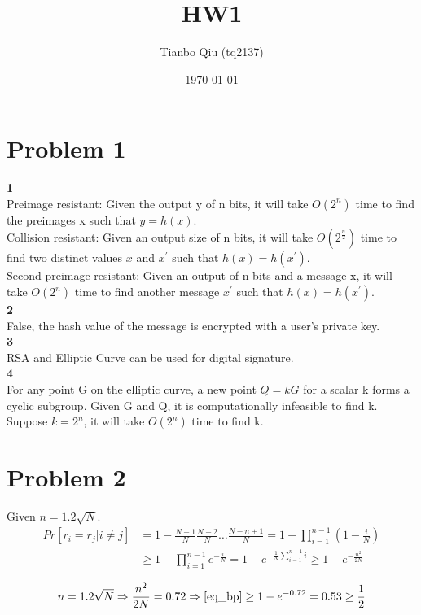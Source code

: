 \documentclass[latterpaper]{article}
\begin{document}
\title{HW1}
\author{Tianbo Qiu (tq2137)}
\date{\today}
\maketitle

\section*{Problem 1}
{\bf\normalsize 1} \\
Preimage resistant: Given the output y of n bits, it will take $O(2^n)$ time to find the preimages x such that $y=h(x)$.\\
Collision resistant: Given an output size of n bits, it will take $O(2^{\frac{n}{2}})$ time to find two distinct values $x$ and $x^{\prime}$ such that $h(x)=h(x^{\prime})$. \\
Second preimage resistant: Given an output of n bits and a message x, it will take $O(2^n)$ time to find another message $x^{\prime}$ such that $h(x)=h(x^{\prime})$.\\
{\bf 2} \\
False, the hash value of the message is encrypted with a user's private key.\\
{\bf 3} \\
RSA and Elliptic Curve can be used for digital signature. \\
{\bf 4} \\
For any point G on the elliptic curve, a new point $Q=kG$ for a scalar k forms a cyclic subgroup. Given G and Q, it is computationally infeasible to find k. Suppose $k=2^n$, it will take $O(2^n)$ time to find k.

\section*{Problem 2}
Given $n=1.2\sqrt{N}$.
\begin{equation}
\label{eq_bp}
\begin{split}
Pr[r_i=r_j | i \neq j] & =1-\frac{N-1}{N}\frac{N-2}{N}\dots\frac{N-n+1}{N}=1-\prod_{i=1}^{n-1} (1-\frac{i}{N}) \\
& \geq 1-\prod_{i=1}^{n-1}e^{-\frac{i}{N}}=1-e^{-\frac{1}{N}\sum_{i=1}^{n-1}i} \geq 1-e^{-\frac{n^2}{2N}}
\end{split}
\end{equation}

\begin{equation}
n=1.2\sqrt{N} \Rightarrow \frac{n^2}{2N}=0.72 \Rightarrow \eqref{eq_bp} \geq 1-e^{-0.72}=0.53\geq \frac{1}{2}
\end{equation}
\end{document}
